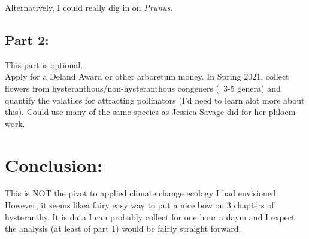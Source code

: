 \documentclass[12pt]{article}
\begin{document}
Alternatively, I could really dig in on \textit{Prunus}.\\

\subsection{Part 2:} 
This part is optional.\\
Apply for a Deland Award or other arboretum money. In Spring 2021, collect flowers from hysteranthous/non-hysteranthous congeners (~3-5 genera) and quantify the volatiles for attracting pollinators (I'd need to learn alot more about this). Could use many of the same species as Jessica Savage did for her phloem work.

\section{Conclusion:}
This is NOT the pivot to applied climate change ecology I had envisioned. However, it seems likea fairy easy way to put a nice bow on 3 chapters of hysteranthy. It is data I can probably collect for one hour a daym and I expect the analysis (at least of part 1) would be fairly straight forward.


\end{document}
